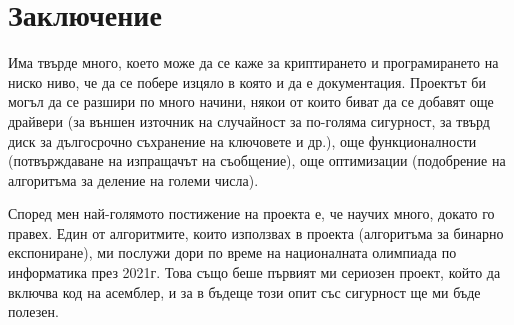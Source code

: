 \chapter*{Заключение}
Има твърде много, което може да се каже за криптирането и програмирането на ниско ниво, че да се побере изцяло в която и да е документация. Проектът би могъл да се разшири по много начини, някои от които биват да се добавят още драйвери (за външен източник на случайност за по-голяма сигурност, за твърд диск за дългосрочно съхранение на ключовете и др.), още функционалности (потвърждаване на изпращачът на съобщение), още оптимизации (подобрение на алгоритъма за деление на големи числа).

Според мен най-голямото постижение на проекта е, че научих много, докато го правех. Един от алгоритмите, които използвах в проекта (алгоритъма за бинарно експониране), ми послужи дори по време на националната олимпиада по информатика през 2021г. Това също беше първият ми сериозен проект, който да включва код на асемблер, и за в бъдеще този опит със сигурност ще ми бъде полезен.

